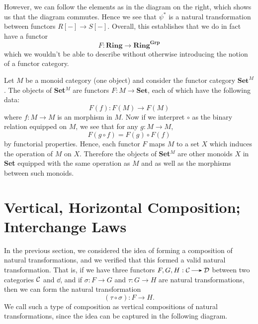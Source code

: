 \begin{example}
\begin{center}
        \end{center}
        However, we can follow the elements as in the diagram on the right, which shows 
        us that the diagram commutes. Hence we see that $\psi^*$ is a natural transformation 
        between functors $R[-] \to S[-]$. Overall, this establishes that we do in fact have 
        a functor 
        \[
            F: \textbf{Ring} \to \textbf{Ring}^{\textbf{Grp}}   
        \]
        which we wouldn't be able to describe without otherwise introducing 
        the notion of a functor category.
    \end{example}

    \begin{example}
        Let $M$ be a monoid category (one object) and
        consider the functor category $\textbf{Set}^M$. The objects of
        \textbf{Set}$^M$ are functors $F: M \to \textbf{Set}$, each
        of which have the following data: 
        \[
            F(f) : F(M) \to F(M)
        \]
        where $f: M \to M$ is an morphism in $M$. Now if we interpret
        $\circ$ as the binary relation equipped on $M$, we see that
        for any $g : M \to M$,
        \[
            F(g \circ f) = F(g) \circ F(f)
        \]
        by functorial properties. Hence, each functor $F$ maps $M$ to
        a set $X$ which induces the operation of $M$ on $X$. Therefore
        the objects of \textbf{Set}$^M$ are other monoids $X$ in
        \textbf{Set} equipped with the same operation as $M$ and as
        well as the morphisms between such monoids. 
    \end{example}

    
    

    \newpage
    \section{Vertical, Horizontal Composition; Interchange Laws}
    In the previous section, we considered the idea of forming a
    composition of natural transformations, and we verified that this
    formed a valid natural transformation. 
    That is, if we have three functors $F, G, H : \cc \to \dd$ between
    two categories $\mathcal{C}$ and $\dd$, and if $\sigma: F \to G$ and
    $\tau:G \to H$ are natural transformations, then we can form the
    natural transformation 
    \[
        (\tau \circ \sigma) : F \to H.
    \]
    We call such a type of composition as
    vertical compositions of natural transformations, 
    since the idea can be captured in the following diagram. 

